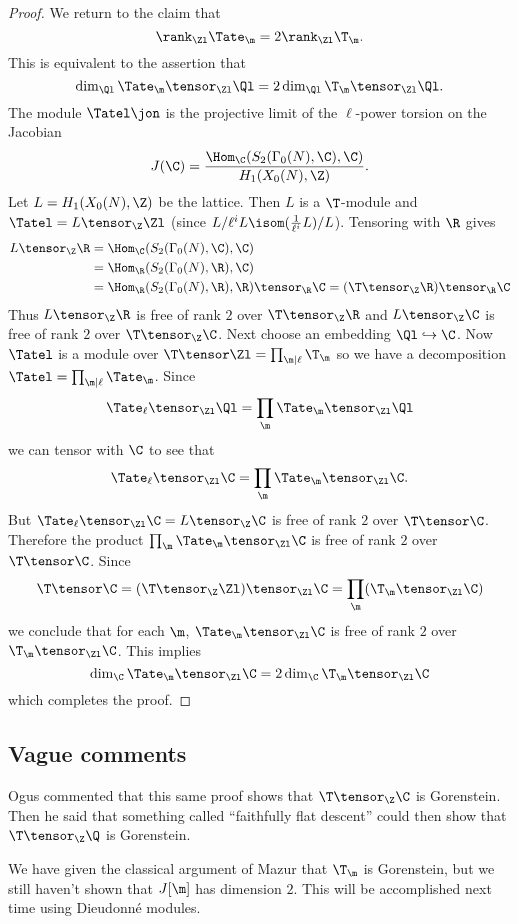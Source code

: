 \documentclass{report}
\begin{document}
\begin{proof}
We return to the claim that
$$\rank_{\Zl}\Tate_\m=2\rank_{\Zl}\T_\m.$$
This is equivalent to the assertion that
$$\dim_{\Ql}\Tate_{\m}\tensor_{\Zl}\Ql=2\dim_{\Ql}\T_\m\tensor_{\Zl}\Ql.$$
The module $\Tatel\jon$ is the projective limit of the $\ell$-power
torsion on the Jacobian
$$J(\C)=\frac{\Hom_{\C}(S_2(\Gamma_0(N),\C),\C)}{H_1(X_0(N),\Z)}.$$
Let $L=H_1(X_0(N),\Z)$ be the lattice. Then $L$ is a $\T$-module and
$\Tatel=L\tensor_{\Z}\Zl$ (since $L/\ell^iL\isom(\frac{1}{\ell^i}L)/L$).
Tensoring with $\R$ gives
\begin{align*}
L\tensor_{\Z}\R&=\Hom_{\C}(S_2(\Gamma_0(N),\C),\C)\\
               &=\Hom_{\R}(S_2(\Gamma_0(N),\R),\C)\\
               &=\Hom_{\R}(S_2(\Gamma_0(N),\R),\R)\tensor_{\R}\C=(\T\tensor_{\Z}\R)\tensor_{\R}\C
\end{align*}
Thus $L\tensor_{\Z}\R$ is free of rank $2$ over $\T\tensor_{\Z}\R$
and $L\tensor_{\Z}\C$ is free of rank $2$ over $\T\tensor_{\Z}\C$.
Next choose an embedding $\Ql\hookrightarrow\C$.
Now $\Tatel$ is a module over $\T\tensor\Zl=\prod_{\m|\ell}\T_\m$
so we have a decomposition $\Tatel=\prod_{\m|\ell}\Tate_\m$. Since
$$\Tate_{\ell}\tensor_{\Zl}\Ql=\prod_{\m}\Tate_\m\tensor_{\Zl}\Ql$$
we can tensor with $\C$ to see that
$$\Tate_{\ell}\tensor_{\Zl}\C=\prod_{\m}\Tate_\m\tensor_{\Zl}\C.$$
But $\Tate_{\ell}\tensor_{\Zl}\C=L\tensor_{\Z}\C$
is free of rank $2$ over $\T\tensor\C$. Therefore
the product $\prod_{\m}\Tate_\m\tensor_{\Zl}\C$
is free of rank $2$ over $\T\tensor\C$. Since
$$\T\tensor\C=(\T\tensor_{\Z}\Zl)\tensor_{\Zl}\C
      =\prod_{\m}(\T_\m\tensor_{\Zl}\C)$$
we conclude that for each $\m$, $\Tate_\m\tensor_{\Zl}\C$
is free of rank $2$ over $\T_\m\tensor_{\Zl}\C$.
This implies
$$\dim_{\C}\Tate_{\m}\tensor_{\Zl}\C=2\dim_{\C}\T_{\m}\tensor_{\Zl}\C$$
which completes the proof.
\end{proof}

\subsection{Vague comments}
Ogus commented that this same proof shows that
$\T\tensor_{\Z}\C$ is Gorenstein. Then he said
that something called ``faithfully flat descent''
could then show that $\T\tensor_{\Z}\Q$ is Gorenstein.

We have given the classical argument of Mazur that
$\T_\m$ is Gorenstein, but we still haven't shown
that $J[\m]$ has dimension $2$. This will be accomplished
next time using Dieudonn\'{e} modules.
\end{document}

